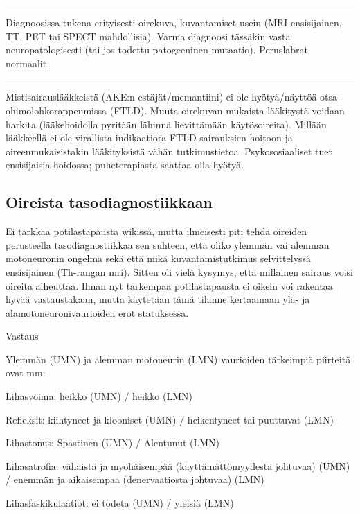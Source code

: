 \documentclass[
]{book}
\begin{document}
\begin{center}\rule{0.5\linewidth}{0.5pt}\end{center}

Diagnoosissa tukena erityisesti oirekuva, kuvantamiset usein (MRI ensisijainen, TT, PET tai SPECT mahdollisia). Varma diagnoosi tässäkin vasta neuropatologisesti (tai jos todettu patogeeninen mutaatio). Peruslabrat normaalit.

\begin{center}\rule{0.5\linewidth}{0.5pt}\end{center}

Mistisairauslääkkeistä (AKE:n estäjät/memantiini) ei ole hyötyä/näyttöä otsa-ohimolohkorappeumissa (FTLD). Muuta oirekuvan mukaista lääkitystä voidaan harkita (lääkehoidolla pyritään lähinnä lievittämään käytösoireita). Millään lääkkeellä ei ole virallista indikaatiota FTLD-sairauksien hoitoon ja oireenmukaisistakin lääkityksistä vähän tutkimustietoa. Psykososiaaliset tuet ensisijaisia hoidossa; puheterapiasta saattaa olla hyötyä.

\subsection{Oireista tasodiagnostiikkaan}\label{oireista-tasodiagnostiikkaan}

Ei tarkkaa potilastapausta wikissä, mutta ilmeisesti piti tehdä oireiden perusteella tasodiagnostiikkaa sen suhteen, että oliko ylemmän vai alemman motoneuronin ongelma sekä että mikä kuvantamistutkimus selvittelyssä ensisijainen (Th-rangan mri). Sitten oli vielä kysymys, että millainen sairaus voisi oireita aiheuttaa. Ilman nyt tarkempaa potilastapausta ei oikein voi rakentaa hyvää vastaustakaan, mutta käytetään tämä tilanne kertaamaan ylä- ja alamotoneuronivaurioiden erot statuksessa.

Vastaus

Ylemmän (UMN) ja alemman motoneurin (LMN) vaurioiden tärkeimpiä piirteitä ovat mm:

Lihasvoima: heikko (UMN) / heikko (LMN)

Refleksit: kiihtyneet ja klooniset (UMN) / heikentyneet tai puuttuvat (LMN)

Lihastonus: Spastinen (UMN) / Alentunut (LMN)

Lihasatrofia: vähäistä ja myöhäisempää (käyttämättömyydestä johtuvaa) (UMN) / enemmän ja aikaisempaa (denervaatiosta johtuvaa) (LMN)

Lihasfaskikulaatiot: ei todeta (UMN) / yleisiä (LMN)
\end{document}
